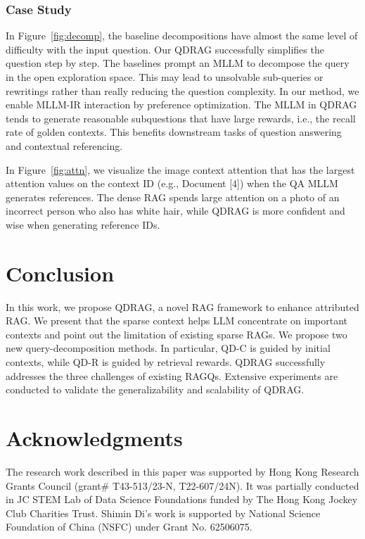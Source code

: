 \documentclass[letterpaper]{article} %
\begin{document}
\subsubsection{Case Study}
In Figure~\ref{fig:decomp}, the baseline decompositions have almost the same level of difficulty with the input question. Our QDRAG successfully simplifies the question step by step.
The baselines prompt an MLLM to decompose the query in the open exploration space. This may lead to unsolvable sub-queries or rewritings rather than really reducing the question complexity. In our method, we enable MLLM-IR interaction by preference optimization. The MLLM in QDRAG tends to generate reasonable subquestions that have large rewards, i.e., the recall rate of golden contexts. This benefits downstream tasks of question answering and contextual referencing.

In Figure~\ref{fig:attn}, we visualize the image context attention that has the largest attention values on the context ID (e.g., Document [4]) when the QA MLLM generates references. The dense RAG spends large attention on a photo of an incorrect person who also has white hair, while QDRAG is more confident and wise when generating reference IDs. 

\section{Conclusion}

In this work, we propose QDRAG, a novel RAG framework to enhance attributed RAG. We present that the sparse context helps LLM concentrate on important contexts and point out the limitation of existing sparse RAGs. We propose two new query-decomposition methods. In particular, QD-C is guided by initial contexts, while QD-R is guided by retrieval rewards. QDRAG successfully addresses the three challenges of existing RAGQs. Extensive experiments are conducted to validate the generalizability and scalability of QDRAG.

\section{Acknowledgments}
The research work described in this paper was supported by Hong Kong Research Grants Council (grant\# T43-513/23-N, T22-607/24N). It was partially conducted in JC STEM Lab of Data Science Foundations funded by The Hong Kong Jockey Club Charities Trust. Shimin Di’s work is supported by National Science Foundation of China (NSFC) under Grant No. 62506075.


\end{document}
